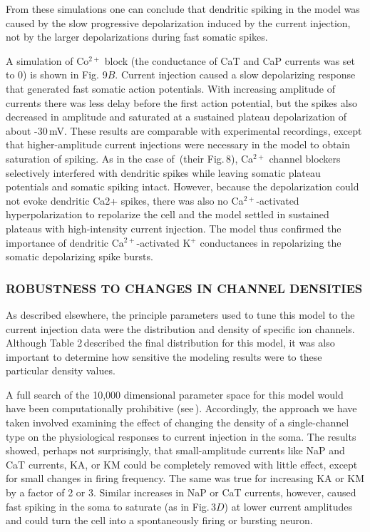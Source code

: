 \documentclass[12pt]{article}
\begin{document}
From these simulations one can conclude that dendritic spiking in the model was caused by the slow progressive
depolarization induced by the current injection, not by the larger depolarizations during fast somatic spikes.

A simulation of Co$^{2+}$ block (the conductance of CaT and CaP currents was set to 0) is shown in Fig. 9$B$. Current injection caused a slow depolarizing response that generated fast somatic action potentials. With increasing amplitude of currents there was less delay before the first action potential, but the spikes also decreased in amplitude and saturated at a sustained plateau depolarization of about -30\,mV. These results are comparable with experimental recordings, except that higher-amplitude current injections were necessary in the model to obtain saturation of spiking. As in the case of\,\cite{R:1980ly} (their Fig.\,8), Ca$^{2+}$ channel blockers selectively interfered with dendritic spikes while leaving somatic plateau potentials and somatic spiking intact. However, because the depolarization could not evoke dendritic Ca2+ spikes, there was also no Ca$^{2+}$-activated hyperpolarization to repolarize the cell and the model settled in sustained plateaus with high-intensity current injection. The model thus confirmed the importance of dendritic Ca$^{2+}$-activated K$^+$ conductances in repolarizing the somatic depolarizing spike bursts.

\subsubsection*{ROBUSTNESS TO CHANGES IN CHANNEL DENSITIES}

As described elsewhere, the principle parameters used to tune this model to the current injection data were the distribution and density of specific ion channels. Although Table 2\,described the final distribution for this model, it was also important to determine how sensitive the modeling results were to these particular density values.

A full search of the 10,000 dimensional parameter space for this model would have been computationally prohibitive (see\,\cite{S:1993dz}). Accordingly, the approach we have taken involved examining the effect of changing the density of a single-channel type on the physiological responses to current injection in the soma. The results showed, perhaps not surprisingly, that small-amplitude currents like NaP and CaT currents, KA, or KM could
be completely removed with little effect, except for small changes in firing frequency. The same was true for increasing KA or KM by a factor of 2 or 3. Similar increases in NaP or CaT currents, however, caused fast spiking in the soma to saturate (as in Fig.\,3$D$) at lower current amplitudes and could turn the cell into a spontaneously firing or bursting neuron.
\end{document}
